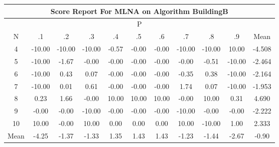 \documentclass[11pt,a4paper]{report}
\begin{document}
\begin{longtable}{ | c || c | c | c | c | c | c | c | c | c || c |}
\hline
\multicolumn{11}{|c|}{ Score Report For MLNA on Algorithm BuildingB} \\
\hline
\multicolumn{11}{|c|}{ P } \\
\hline
N & .1 & .2 & .3 & .4 & .5 & .6 & .7 & .8 & .9 & Mean\\
 \hline
 \hline
 \endhead
  4 &  \cellcolor[HTML]{FF0000} -10.00 &  \cellcolor[HTML]{FF0000} -10.00 &  \cellcolor[HTML]{FF0000} -10.00 &  \cellcolor[HTML]{FFEFEF} -0.57 &  \cellcolor[HTML]{FFFFFF} -0.00 &  \cellcolor[HTML]{FFFFFF} -0.00 &  \cellcolor[HTML]{FF0000} -10.00 &  \cellcolor[HTML]{FF0000} -10.00 &  \cellcolor[HTML]{0808FF} 10.00 & -4.508 \\
  5 &  \cellcolor[HTML]{FF0000} -10.00 &  \cellcolor[HTML]{FFD7D7} -1.67 &  \cellcolor[HTML]{FFFFFF} -0.00 &  \cellcolor[HTML]{FFFFFF} -0.00 &  \cellcolor[HTML]{FFFFFF} -0.00 &  \cellcolor[HTML]{FFFFFF} -0.00 &  \cellcolor[HTML]{FFFFFF} -0.00 &  \cellcolor[HTML]{FFEFEF} -0.51 &  \cellcolor[HTML]{FF0000} -10.00 & -2.464 \\
  6 &  \cellcolor[HTML]{FF0000} -10.00 &  \cellcolor[HTML]{F7F7FF} 0.43 &  \cellcolor[HTML]{FFFFFF} 0.07 &  \cellcolor[HTML]{FFFFFF} -0.00 &  \cellcolor[HTML]{FFFFFF} -0.00 &  \cellcolor[HTML]{FFFFFF} -0.00 &  \cellcolor[HTML]{FFF7F7} -0.35 &  \cellcolor[HTML]{F7F7FF} 0.38 &  \cellcolor[HTML]{FF0000} -10.00 & -2.164 \\
  7 &  \cellcolor[HTML]{FF0000} -10.00 &  \cellcolor[HTML]{FFFFFF} 0.01 &  \cellcolor[HTML]{EFEFFF} 0.61 &  \cellcolor[HTML]{FFFFFF} -0.00 &  \cellcolor[HTML]{FFFFFF} -0.00 &  \cellcolor[HTML]{FFFFFF} -0.00 &  \cellcolor[HTML]{D7D7FF} 1.74 &  \cellcolor[HTML]{FFFFFF} 0.07 &  \cellcolor[HTML]{FF0000} -10.00 & -1.953 \\
  8 &  \cellcolor[HTML]{F7F7FF} 0.23 &  \cellcolor[HTML]{D7D7FF} 1.66 &  \cellcolor[HTML]{FFFFFF} -0.00 &  \cellcolor[HTML]{0808FF} 10.00 &  \cellcolor[HTML]{0808FF} 10.00 &  \cellcolor[HTML]{0808FF} 10.00 &  \cellcolor[HTML]{FFFFFF} -0.00 &  \cellcolor[HTML]{0808FF} 10.00 &  \cellcolor[HTML]{F7F7FF} 0.31 & 4.690 \\
  9 &  \cellcolor[HTML]{FFFFFF} -0.00 &  \cellcolor[HTML]{FFFFFF} -0.00 &  \cellcolor[HTML]{FF0000} -10.00 &  \cellcolor[HTML]{FFFFFF} -0.00 &  \cellcolor[HTML]{FFFFFF} -0.00 &  \cellcolor[HTML]{FFFFFF} -0.00 &  \cellcolor[HTML]{FF0000} -10.00 &  \cellcolor[HTML]{FFFFFF} -0.00 &  \cellcolor[HTML]{FFFFFF} -0.00 & -2.222 \\
  10 &  \cellcolor[HTML]{0808FF} 10.00 &  \cellcolor[HTML]{FFFFFF} -0.00 &  \cellcolor[HTML]{0808FF} 10.00 &  \cellcolor[HTML]{FFFFFF} 0.00 &  \cellcolor[HTML]{FFFFFF} 0.00 &  \cellcolor[HTML]{FFFFFF} 0.00 &  \cellcolor[HTML]{0808FF} 10.00 &  \cellcolor[HTML]{FF0000} -10.00 &  \cellcolor[HTML]{E7E7FF} 1.00 & 2.333 \\
 \hline
 \hline
Mean &  \cellcolor[HTML]{FF9797} -4.25 &  \cellcolor[HTML]{FFDFDF} -1.37 &  \cellcolor[HTML]{FFDFDF} -1.33 &  \cellcolor[HTML]{DFDFFF} 1.35 &  \cellcolor[HTML]{DFDFFF} 1.43 &  \cellcolor[HTML]{DFDFFF} 1.43 &  \cellcolor[HTML]{FFDFDF} -1.23 &  \cellcolor[HTML]{FFD7D7} -1.44 &  \cellcolor[HTML]{FFBFBF} -2.67 &  \cellcolor[HTML]{FFE7E7} -0.90
\end{longtable}
\end{document}
